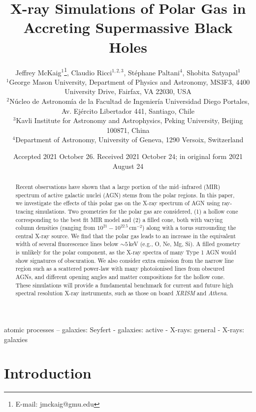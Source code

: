 \documentclass[fleqn,usenatbib]{mnras}
\title[X-ray Simulations of Polar Gas]{X-ray Simulations of Polar Gas in Accreting Supermassive Black Holes}
\author[McKaig et al.]{
Jeffrey McKaig$^{1}$\thanks{E-mail: jmckaig@gmu.edu},
Claudio Ricci$^{1,2,3}$,
St\'ephane Paltani$^{4}$,
Shobita Satyapal$^{1}$
\\
$^{1}$George Mason University, Department of Physics and Astronomy, MS3F3, 4400 University Drive, Fairfax, VA 22030, USA\\
$^{2}$N\'ucleo de Astronom\'ia de la Facultad de Ingenier\'ia Universidad Diego Portales, Av. Ej\'ercito Libertador 441, Santiago, Chile\\
$^{3}$Kavli Institute for Astronomy and Astrophysics, Peking University, Beijing 100871, China\\
$^{4}$Department of Astronomy, University of Geneva, 1290 Versoix, Switzerland
}
\date{Accepted 2021 October 26. Received 2021 October 24; in original form 2021 August 24}
\begin{document}
\label{firstpage}
\pagerange{\pageref{firstpage}--\pageref{lastpage}}
\maketitle

\begin{abstract}
\indent Recent observations have shown that a large portion of the mid--infrared (MIR) spectrum of active galactic nuclei (AGN) stems from the polar regions. In this paper, we investigate the effects of this polar gas on the X-ray spectrum of AGN using ray-tracing simulations. Two geometries for the polar gas are considered, (1) a hollow cone corresponding to the best fit MIR model and (2) a filled cone, both with varying column densities (ranging from $10^{21}-10^{22.5}$\,cm$^{-2}$) along with a torus surrounding the central X-ray source. We find that the polar gas leads to an increase in the equivalent width of several fluorescence lines below $\sim 5$\,keV (e.g., O, Ne, Mg, Si). A filled geometry is unlikely for the polar component, as the X-ray spectra of many Type 1 AGN would show signatures of obscuration. We also consider extra emission from the narrow line region such as a scattered power-law with many photoionised lines from obscured AGNs, and different opening angles and matter compositions for the hollow cone. These simulations will provide a fundamental benchmark for current and future high spectral resolution X-ray instruments, such as those on board {\it XRISM} and {\it Athena}. 

\end{abstract}

\begin{keywords}
atomic processes – galaxies: Seyfert - galaxies: active - X-rays: general - X-rays: galaxies
\end{keywords}



\section{Introduction}
\end{document}
